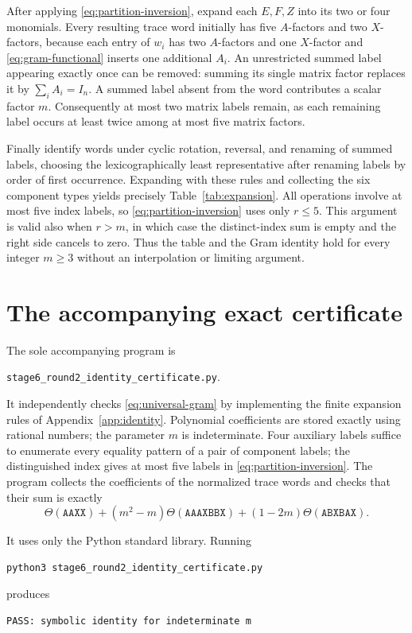 \documentclass[11pt]{article}
\newcommand{\Id}{I_n}
\newcommand{\word}[1]{\mathtt{#1}}
\begin{document}
After applying \eqref{eq:partition-inversion}, expand each
\(E,F,Z\) into its two or four monomials. Every resulting trace word
initially has five \(A\)-factors and two \(X\)-factors, because each
entry of \(w_i\) has two \(A\)-factors and one \(X\)-factor and
\eqref{eq:gram-functional} inserts one additional \(A_i\).
An unrestricted summed label appearing exactly once can be removed:
summing its single matrix factor replaces it by
\(\sum_iA_i=\Id\). A summed label absent from the word contributes
a scalar factor \(m\). Consequently at most two matrix labels remain,
as each remaining label occurs at least twice among at most five
matrix factors.

Finally identify words under cyclic rotation, reversal, and renaming
of summed labels, choosing the lexicographically least representative
after renaming labels by order of first occurrence. Expanding with
these rules and collecting the six component types yields precisely
Table~\ref{tab:expansion}. All operations involve at most five index
labels, so \eqref{eq:partition-inversion} uses only \(r\le5\).
This argument is valid also when \(r>m\), in which case the
distinct-index sum is empty and the right side cancels to zero.
Thus the table and the Gram identity hold for every integer
\(m\ge3\) without an interpolation or limiting argument.

\FloatBarrier
\section{The accompanying exact certificate}\label{app:certificate}

The sole accompanying program is
\begin{center}
 \texttt{stage6\_round2\_identity\_certificate.py}.
\end{center}

It independently checks \eqref{eq:universal-gram} by implementing the
finite expansion rules of Appendix~\ref{app:identity}.
Polynomial coefficients are stored exactly using rational numbers;
the parameter \(m\) is indeterminate. Four auxiliary labels suffice
to enumerate every equality pattern of a pair of component labels;
the distinguished index gives at most five labels in
\eqref{eq:partition-inversion}. The program collects the coefficients
of the normalized trace words and checks that their sum is exactly
\[
 \Theta(\word{AAXX})+
 (m^2-m)\Theta(\word{AAAXBBX})+
 (1-2m)\Theta(\word{ABXBAX}).
\]

It uses only the Python standard library. Running
\begin{verbatim}
python3 stage6_round2_identity_certificate.py
\end{verbatim}
produces
\begin{verbatim}
PASS: symbolic identity for indeterminate m
\end{verbatim}
\end{document}
